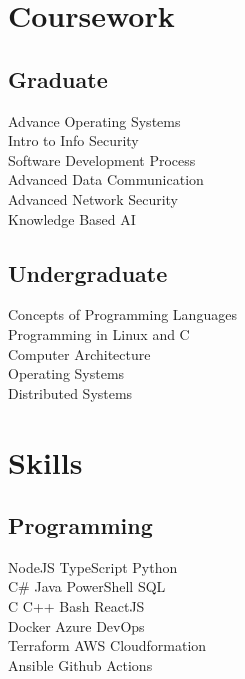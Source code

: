 \documentclass[]{deedy-resume-openfont}
\begin{document}
\begin{minipage}[t]{0.33\textwidth}

\section{Coursework}
\subsection{Graduate}
Advance Operating Systems \\
Intro to Info Security \\
Software Development Process \\
Advanced Data Communication \\
Advanced Network Security \\
Knowledge Based AI
\sectionsep
\subsection{Undergraduate}
Concepts of Programming Languages \\
Programming in Linux and C \\
Computer Architecture \\
Operating Systems \\
Distributed Systems
\sectionsep


\section{Skills}
\subsection{Programming}

NodeJS \textbullet{} TypeScript \textbullet{}  Python \\
C\# \textbullet{} Java \textbullet{} PowerShell \textbullet{} SQL \\
C \textbullet{} C++ \textbullet{} Bash \textbullet{} ReactJS \\

Docker \textbullet{} Azure DevOps  \\
Terraform \textbullet{} AWS Cloudformation \\
Ansible \textbullet{} Github Actions \\


\end{minipage}
\end{document}
